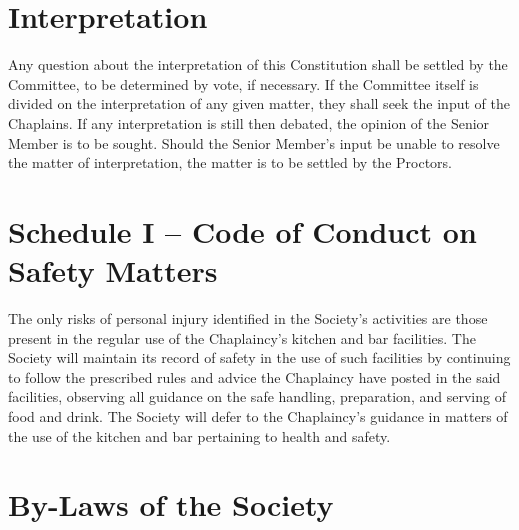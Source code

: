 \documentclass[11pt]{article}
\begin{document}
\section{Interpretation}
Any question about the interpretation of this Constitution shall be settled by the Committee, to be determined by vote, if necessary. If the Committee itself is divided on the interpretation of any given matter, they shall seek the input of the Chaplains. If any interpretation is still then debated, the opinion of the Senior Member is to be sought. Should the Senior Member's input be unable to resolve the matter of interpretation, the matter is to be settled by the Proctors.
\section{Schedule I -- Code of Conduct on Safety Matters}
The only risks of personal injury identified in the Society's activities are those present in the regular use of the Chaplaincy's kitchen and bar facilities. The Society will maintain its record of safety in the use of such facilities by continuing to follow the prescribed rules and advice the Chaplaincy have posted in the said facilities, observing all guidance on the safe handling, preparation, and serving of food and drink. The Society will defer to the Chaplaincy's guidance in matters of the use of the kitchen and bar pertaining to health and safety.
\section{By-Laws of the Society}
\end{document}
